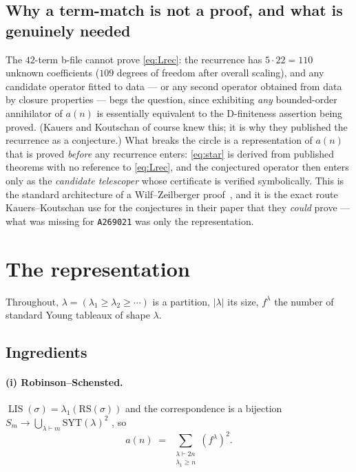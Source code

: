 \documentclass[11pt]{article}
\theoremstyle{plain}
\theoremstyle{definition}
\theoremstyle{remark}
\newcommand{\OEIS}[1]{\texttt{#1}}
\newcommand{\LIS}{\operatorname{LIS}}
\begin{document}
\subsection{Why a term-match is not a proof, and what is genuinely needed}

The $42$-term b-file cannot prove \eqref{eq:Lrec}: the recurrence has
$5\cdot22=110$ unknown coefficients ($109$ degrees of freedom after overall scaling), and any
candidate operator fitted to data --- or any second
operator obtained from data by closure properties --- begs the question, since exhibiting
\emph{any} bounded-order annihilator of $a(n)$ is essentially equivalent to the D-finiteness
assertion being proved. (Kauers and Koutschan of course knew this; it is why they published the
recurrence as a conjecture.) What breaks the circle is a representation of $a(n)$ that is proved
\emph{before} any recurrence enters: \eqref{eq:star} is derived from published theorems with no
reference to \eqref{eq:Lrec}, and the conjectured operator then enters only as the \emph{candidate
telescoper} whose certificate is verified symbolically. This is the standard architecture of a
Wilf--Zeilberger proof~\cite{Zei91,PWZ96}, and it is the exact route Kauers--Koutschan use for
the conjectures in their paper that they \emph{could} prove --- what was missing for
\OEIS{A269021} was only the representation.

\section{The representation}\label{sec:rep}

Throughout, $\lambda=(\lambda_1\ge\lambda_2\ge\cdots)$ is a partition, $|\lambda|$ its size,
$f^\lambda$ the number of standard Young tableaux of shape $\lambda$.

\subsection{Ingredients}

\paragraph{(i) Robinson--Schensted.} $\LIS(\sigma)=\lambda_1(\mathrm{RS}(\sigma))$ and the
correspondence is a bijection $S_m\to\bigcup_{\lambda\vdash m}\mathrm{SYT}(\lambda)^2$
\cite{Sch61}, so
\begin{equation}\label{eq:rsk}
  a(n)\;=\;\sum_{\substack{\lambda\vdash 2n\\ \lambda_1\ge n}} (f^\lambda)^2 .
\end{equation}
\end{document}
